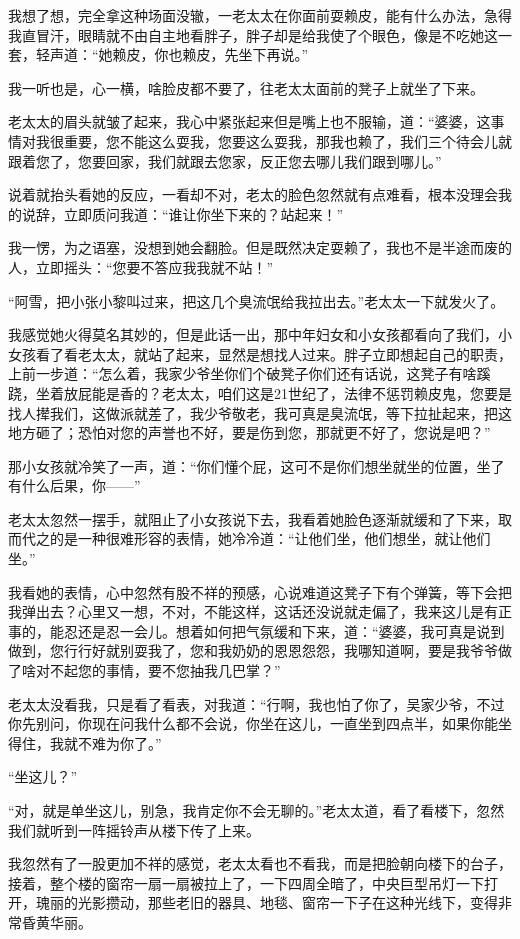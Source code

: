 我想了想，完全拿这种场面没辙，一老太太在你面前耍赖皮，能有什么办法，急得我直冒汗，眼睛就不由自主地看胖子，胖子却是给我使了个眼色，像是不吃她这一套，轻声道：“她赖皮，你也赖皮，先坐下再说。”

我一听也是，心一横，啥脸皮都不要了，往老太太面前的凳子上就坐了下来。

老太太的眉头就皱了起来，我心中紧张起来但是嘴上也不服输，道：“婆婆，这事情对我很重要，您不能这么耍我，您要这么耍我，那我也赖了，我们三个待会儿就跟着您了，您要回家，我们就跟去您家，反正您去哪儿我们跟到哪儿。”

说着就抬头看她的反应，一看却不对，老太的脸色忽然就有点难看，根本没理会我的说辞，立即质问我道：“谁让你坐下来的？站起来！”

我一愣，为之语塞，没想到她会翻脸。但是既然决定耍赖了，我也不是半途而废的人，立即摇头：“您要不答应我我就不站！”

“阿雪，把小张小黎叫过来，把这几个臭流氓给我拉出去。”老太太一下就发火了。

我感觉她火得莫名其妙的，但是此话一出，那中年妇女和小女孩都看向了我们，小女孩看了看老太太，就站了起来，显然是想找人过来。胖子立即想起自己的职责，上前一步道：“怎么着，我家少爷坐你们个破凳子你们还有话说，这凳子有啥蹊跷，坐着放屁能是香的？老太太，咱们这是21世纪了，法律不惩罚赖皮鬼，您要是找人撵我们，这做派就差了，我少爷敬老，我可真是臭流氓，等下拉扯起来，把这地方砸了；恐怕对您的声誉也不好，要是伤到您，那就更不好了，您说是吧？”

那小女孩就冷笑了一声，道：“你们懂个屁，这可不是你们想坐就坐的位置，坐了有什么后果，你——”

老太太忽然一摆手，就阻止了小女孩说下去，我看着她脸色逐渐就缓和了下来，取而代之的是一种很难形容的表情，她冷冷道：“让他们坐，他们想坐，就让他们坐。”

我看她的表情，心中忽然有股不祥的预感，心说难道这凳子下有个弹簧，等下会把我弹出去？心里又一想，不对，不能这样，这话还没说就走偏了，我来这儿是有正事的，能忍还是忍一会儿。想着如何把气氛缓和下来，道：“婆婆，我可真是说到做到，您行行好就别耍我了，您和我奶奶的恩恩怨怨，我哪知道啊，要是我爷爷做了啥对不起您的事情，要不您抽我几巴掌？”

老太太没看我，只是看了看表，对我道：“行啊，我也怕了你了，吴家少爷，不过你先别问，你现在问我什么都不会说，你坐在这儿，一直坐到四点半，如果你能坐得住，我就不难为你了。”

“坐这儿？”

“对，就是单坐这儿，别急，我肯定你不会无聊的。”老太太道，看了看楼下，忽然我们就听到一阵摇铃声从楼下传了上来。

我忽然有了一股更加不祥的感觉，老太太看也不看我，而是把脸朝向楼下的台子，接着，整个楼的窗帘一扇一扇被拉上了，一下四周全暗了，中央巨型吊灯一下打开，瑰丽的光影攒动，那些老旧的器具、地毯、窗帘一下子在这种光线下，变得非常昏黄华丽。

